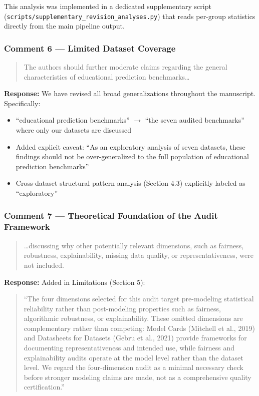 \documentclass[12pt,a4paper]{article}
\begin{document}
This analysis was implemented in a dedicated supplementary script (\texttt{scripts/supplementary\_revision\_analyses.py}) that reads per-group statistics directly from the main pipeline output.

\subsubsection*{Comment 6 --- Limited Dataset Coverage}

\begin{quote}
The authors should further moderate claims regarding the general characteristics of educational prediction benchmarks\ldots
\end{quote}

\textbf{Response:} We have revised all broad generalizations throughout the manuscript. Specifically:
\begin{itemize}[nosep]
\item ``educational prediction benchmarks'' $\rightarrow$ ``the seven audited benchmarks'' where only our datasets are discussed
\item Added explicit caveat: ``As an exploratory analysis of seven datasets, these findings should not be over-generalized to the full population of educational prediction benchmarks''
\item Cross-dataset structural pattern analysis (Section 4.3) explicitly labeled as ``exploratory''
\end{itemize}

\subsubsection*{Comment 7 --- Theoretical Foundation of the Audit Framework}

\begin{quote}
\ldots discussing why other potentially relevant dimensions, such as fairness, robustness, explainability, missing data quality, or representativeness, were not included.
\end{quote}

\textbf{Response:} Added in Limitations (Section 5):

\begin{quote}
``The four dimensions selected for this audit target pre-modeling statistical reliability rather than post-modeling properties such as fairness, algorithmic robustness, or explainability. These omitted dimensions are complementary rather than competing: Model Cards (Mitchell et al., 2019) and Datasheets for Datasets (Gebru et al., 2021) provide frameworks for documenting representativeness and intended use, while fairness and explainability audits operate at the model level rather than the dataset level. We regard the four-dimension audit as a minimal necessary check before stronger modeling claims are made, not as a comprehensive quality certification.''
\end{quote}
\end{document}
